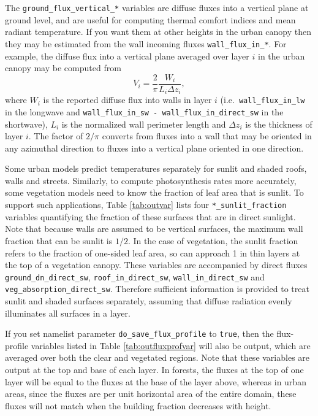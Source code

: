 \documentclass[a4,oneside]{article}
\def\codesize{\small}
\def\code#1{{\codesize\texttt{#1}}}
\begin{document}
The \code{ground\_flux\_vertical\_*} variables are diffuse fluxes into
a vertical plane at ground level, and are useful for computing thermal
comfort indices and mean radiant temperature. If you want them at
other heights in the urban canopy then they may be estimated from the
wall incoming fluxes \code{wall\_flux\_in\_*}. For example, the
diffuse flux into a vertical plane averaged over layer $i$ in the
urban canopy may be computed from 
%
\begin{equation}
V_i = \frac{2}{\pi}\frac{W_i}{L_i\Delta z_i},
\end{equation}
%
where $W_i$ is the reported diffuse flux into walls in layer $i$
(i.e.\ \code{wall\_flux\_in\_lw} in the longwave and
\code{wall\_flux\_in\_sw - wall\_flux\_in\_direct\_sw} in the
shortwave), $L_i$ is the normalized wall perimeter length and $\Delta
z_i$ is the thickness of layer $i$. The factor of $2/\pi$ converts
from fluxes into a wall that may be oriented in any azimuthal
direction to fluxes into a vertical plane oriented in one direction.

Some urban models predict temperatures separately for sunlit and
shaded roofs, walls and streets.  Similarly, to compute photosynthesis
rates more accurately, some vegetation models need to know the
fraction of leaf area that is sunlit.  To support such applications,
Table \ref{tab:outvar} lists four \code{*\_sunlit\_fraction} variables
quantifying the fraction of these surfaces that are in direct
sunlight.  Note that because walls are assumed to be vertical
surfaces, the maximum wall fraction that can be sunlit is $1/2$. In
the case of vegetation, the sunlit fraction refers to the fraction of
one-sided leaf area, so can approach 1 in thin layers at the top of a
vegetation canopy. These variables are accompanied by direct fluxes
\code{ground\_dn\_direct\_sw}, \code{roof\_in\_direct\_sw},
\code{wall\_in\_direct\_sw} and \code{veg\_absorption\_direct\_sw}.
Therefore sufficient information is provided to treat sunlit and
shaded surfaces separately, assuming that diffuse radiation evenly
illuminates all surfaces in a layer.

If you set namelist parameter \code{do\_save\_flux\_profile} to
\code{true}, then the flux-profile variables listed in Table
\ref{tab:outfluxprofvar} will also be output, which are averaged over
both the clear and vegetated regions. Note that these variables are
output at the top and base of each layer.  In forests, the fluxes at
the top of one layer will be equal to the fluxes at the base of the
layer above, whereas in urban areas, since the fluxes are per unit
horizontal area of the entire domain, these fluxes will not match when
the building fraction decreases with height.
\end{document}
